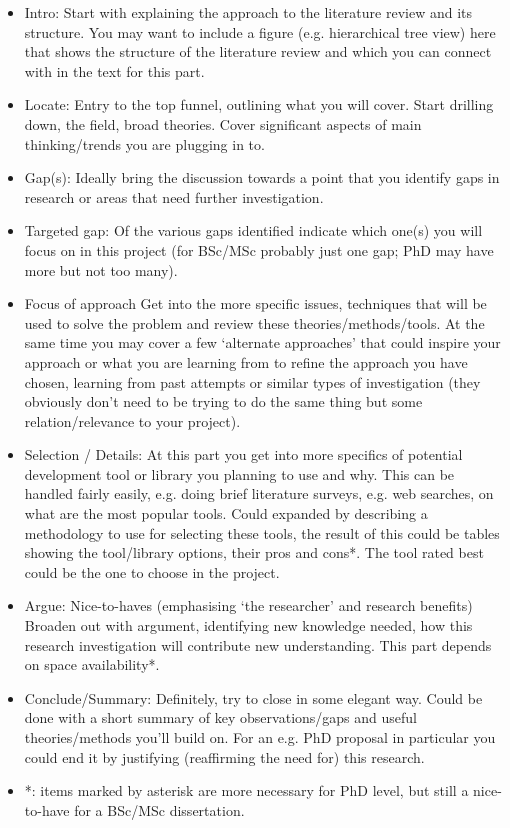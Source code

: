 \begin{itemize}
	\item Intro: Start with explaining the approach to the literature review and its structure. You may want to include a figure (e.g. hierarchical tree view) here that shows the structure of the literature review and which you can connect with in the text for this part.
	\item Locate: Entry to the top funnel, outlining what you will cover. Start drilling down, the field, broad theories. Cover significant aspects of main thinking/trends you are plugging in to.
	\item Gap(s): Ideally bring the discussion towards a point that you identify gaps in research or areas that need further investigation.
	\item Targeted gap: Of the various gaps identified indicate which one(s) you will focus on 
	in this project (for BSc/MSc probably just one gap; PhD may have more but not too many).
	\item Focus of approach Get into the more specific issues, techniques that will be used to solve the problem and review these theories/methods/tools.
	At the same time you may cover a few ‘alternate approaches’ that could inspire your approach or what you are learning from to refine the approach you have chosen, learning from past attempts or similar types of investigation (they obviously don’t need to be trying to do the same thing but some relation/relevance to your project).
	\item Selection / Details: At this part you get into more specifics of potential development tool or library you planning to use and why.
	This can be handled fairly easily, e.g. doing brief literature surveys, e.g. web searches, on what are the most popular tools. Could expanded by describing a methodology to use for selecting these tools, the result of this could be tables showing the tool/library options, their pros and cons*. The tool rated best could be the one to choose in the project.
	\item Argue: Nice-to-haves (emphasising ‘the researcher’ and research benefits) Broaden out with argument, identifying new knowledge needed, how this research investigation will contribute new understanding. This part depends on space availability*.
	\item Conclude/Summary: Definitely, try to close in some elegant way. Could be done with a short summary of key observations/gaps and useful theories/methods you’ll build on. For an e.g. PhD proposal in particular you could end it by justifying (reaffirming the need for) this research.
	\item *: items marked by asterisk are more necessary for PhD level, but still a nice-to-have for a BSc/MSc dissertation.
\end{itemize}

